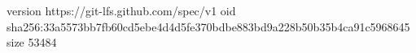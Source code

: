 version https://git-lfs.github.com/spec/v1
oid sha256:33a5573bb7fb60cd5ebe4d4d5fe370bdbe883bd9a228b50b35b4ca91c5968645
size 53484
